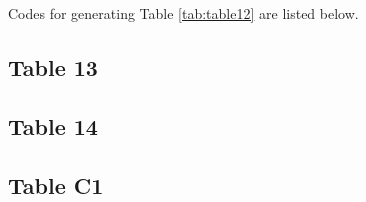 \documentclass{article}
\begin{document}
Codes for generating Table \ref{tab:table12} are listed below.


\subsection{Table 13}



\subsection{Table 14}

\subsection{Table C1}
\end{document}

